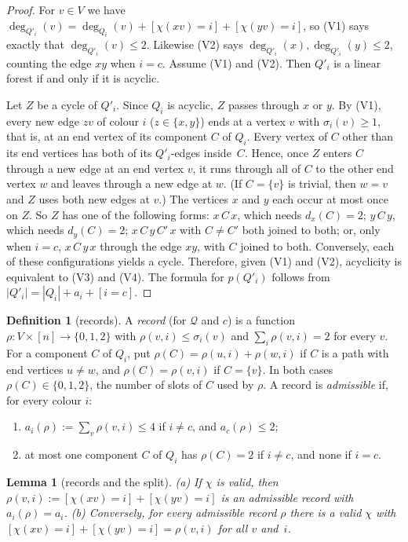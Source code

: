 \documentclass[11pt]{amsart}
\newtheorem{lemma}[theorem]{Lemma}
\theoremstyle{definition}
\newtheorem{definition}[theorem]{Definition}
\theoremstyle{remark}
\newcommand{\Q}{\mathcal{Q}}
\begin{document}
\begin{proof}
For $v\in V$ we have $\deg_{Q'_i}(v)=\deg_{Q_i}(v)+[\chi(xv)=i]+[\chi(yv)=i]$, so (V1) says
exactly that $\deg_{Q'_i}(v)\le2$. Likewise (V2) says $\deg_{Q'_i}(x),\deg_{Q'_i}(y)\le2$,
counting the edge $xy$ when $i=c$. Assume (V1) and (V2). Then $Q'_i$ is a linear forest if and
only if it is acyclic.

Let $Z$ be a cycle of $Q'_i$. Since $Q_i$ is acyclic, $Z$ passes through $x$ or $y$. By (V1),
every new edge $zv$ of colour $i$ ($z\in\{x,y\}$) ends at a vertex $v$ with
$\sigma_i(v)\ge1$, that is, at an end vertex of its component $C$ of $Q_i$. Every vertex of
$C$ other than its end vertices has both of its $Q'_i$-edges inside~$C$. Hence, once $Z$ enters
$C$ through a new edge at an end vertex $v$, it runs through all of $C$ to the other end vertex
$w$ and leaves through a new edge at $w$. (If $C=\{v\}$ is trivial, then $w=v$ and $Z$ uses
both new edges at $v$.) The vertices $x$ and $y$ each occur at most once on $Z$. So $Z$ has one
of the following forms:
$x\,C\,x$, which needs $d_x(C)=2$;
$y\,C\,y$, which needs $d_y(C)=2$;
$x\,C\,y\,C'\,x$ with $C\ne C'$ both joined to both;
or, only when $i=c$, $x\,C\,y\,x$ through the edge $xy$, with $C$ joined to both.
Conversely, each of these configurations yields a cycle. Therefore, given (V1) and (V2),
acyclicity is equivalent to (V3) and (V4). The formula for $p(Q'_i)$ follows from
$|Q'_i|=|Q_i|+a_i+[i=c]$.
\end{proof}

\begin{definition}[records]\label{def:record}
A \emph{record} (for $\Q$ and $c$) is a function $\rho:V\times[n]\to\{0,1,2\}$ with
$\rho(v,i)\le\sigma_i(v)$ and $\sum_i\rho(v,i)=2$ for every $v$. For a component $C$ of
$Q_i$, put $\rho(C)=\rho(u,i)+\rho(w,i)$ if $C$ is a path with end vertices $u\ne w$, and
$\rho(C)=\rho(v,i)$ if $C=\{v\}$. In both cases $\rho(C)\in\{0,1,2\}$, the number of slots of
$C$ used by $\rho$. A record is \emph{admissible} if, for every colour $i$:
\begin{enumerate}[label=\textup{(R\arabic*)},leftmargin=*]
\item $a_i(\rho):=\sum_{v}\rho(v,i)\le 4$ if $i\ne c$, and $a_c(\rho)\le2$;
\item at most one component $C$ of $Q_i$ has $\rho(C)=2$ if $i\ne c$, and none if $i=c$.
\end{enumerate}
\end{definition}

\begin{lemma}[records and the split]\label{lem:record}
\textup{(a)} If $\chi$ is valid, then $\rho(v,i):=[\chi(xv)=i]+[\chi(yv)=i]$ is an admissible
record with $a_i(\rho)=a_i$.
\textup{(b)} Conversely, for every admissible record $\rho$ there is a valid $\chi$ with
$[\chi(xv)=i]+[\chi(yv)=i]=\rho(v,i)$ for all $v$ and~$i$.
\end{lemma}
\end{document}
